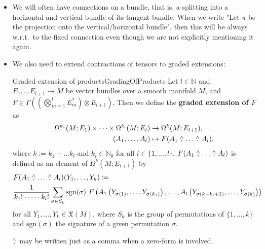\documentclass[reqno,a4paper,oneside]{amsart}
\theoremstyle{plain}
\theoremstyle{remark}
\theoremstyle{definition}
\def\ba#1\ea{\begin{align}#1\end{align}}
\begin{document}
\begin{itemize}
\item We will often have connections on a bundle, that is, a splitting into a horizontal and vertical bundle of its tangent bundle. When we write "Let $\pi$ be the projection onto the vertical/horizontal bundle", then this will be always w.r.t.\ to the fixed connection even though we are not explicitly mentioning it again.

\item We also need to extend contractions of tensors to graded extensions:
\begin{definitions}{Graded extension of products}{GradingOfProducts}
Let $l \in \mathbb{N}$ and $E_1, \dots E_{l+1} \to M$ be vector bundles over a smooth manifold $M$, and $F \in \Gamma\left( \left(\bigotimes_{m=1}^{l} E_m^*\right) \otimes E_{l+1} \right)$. Then we define the \textbf{graded extension of $F$} as
	\begin{align*}
\Omega^{k_1}(M; E_1) \times \dots \times \Omega^{k_l}(M; E_l)
&\to \Omega^{k}(M; E_{l+1}), \\
(A_1, \dots, A_l)
&\mapsto
F\mleft(A_1\stackrel{\wedge}{,} \dotsc \stackrel{\wedge}{,} A_l\mright),
\end{align*}
where $k := k_1+\dots k_l$ and $k_i \in \mathbb{N}_0$ for all $i\in \{1, \dots, l\}$. $F\mleft(A_1\stackrel{\wedge}{,} \dotsc \stackrel{\wedge}{,} A_l\mright)$ is defined as an element of $\Omega^{k}(M; E_{l+1})$ by
\begin{align*}
&F\mleft(A_1\stackrel{\wedge}{,} \dotsc \stackrel{\wedge}{,} A_l\mright)\mleft(Y_1, \dots, Y_{k}\mright)
\coloneqq \\
&\frac{1}{k_1! \cdot \dots \cdot k_l!} \sum_{\sigma \in S_{k}} \mathrm{sgn}(\sigma) ~ F\left( A_1\left( Y_{\sigma(1)}, \dots, Y_{\sigma(k_1)} \right), \dots, A_l\left( Y_{\sigma(k-k_l+1)}, \dots, Y_{\sigma(k)} \right) \right)
\end{align*}
for all $Y_1, \dots, Y_{k} \in \mathfrak{X}(M)$, where $S_{k}$ is the group of permutations of $\{1, \dots, k\}$ and $\mathrm{sgn}(\sigma)$ the signature of a given permutation $\sigma$. 

$\stackrel{\wedge}{,}$ may be written just as a comma when a zero-form is involved.
%
\end{definitions}


\end{itemize}
\end{document}
